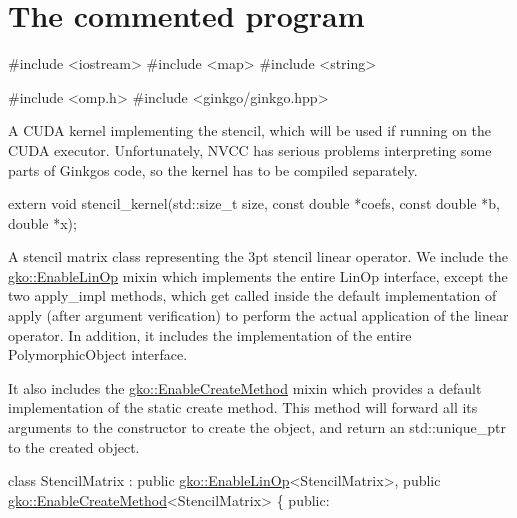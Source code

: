 \label{_CommProg}%
 \section*{The commented program}


\begin{DoxyCode}
\textcolor{preprocessor}{#include <iostream>}
\textcolor{preprocessor}{#include <map>}
\textcolor{preprocessor}{#include <string>}


\textcolor{preprocessor}{#include <omp.h>}
\textcolor{preprocessor}{#include <ginkgo/ginkgo.hpp>}
\end{DoxyCode}


A C\+U\+DA kernel implementing the stencil, which will be used if running on the C\+U\+DA executor. Unfortunately, N\+V\+CC has serious problems interpreting some parts of Ginkgo\textquotesingle{}s code, so the kernel has to be compiled separately.


\begin{DoxyCode}
\textcolor{keyword}{extern} \textcolor{keywordtype}{void} stencil\_kernel(std::size\_t size, \textcolor{keyword}{const} \textcolor{keywordtype}{double} *coefs,
                           \textcolor{keyword}{const} \textcolor{keywordtype}{double} *b, \textcolor{keywordtype}{double} *x);
\end{DoxyCode}


A stencil matrix class representing the 3pt stencil linear operator. We include the \hyperlink{classgko_1_1EnableLinOp}{gko\+::\+Enable\+Lin\+Op} mixin which implements the entire Lin\+Op interface, except the two apply\+\_\+impl methods, which get called inside the default implementation of apply (after argument verification) to perform the actual application of the linear operator. In addition, it includes the implementation of the entire Polymorphic\+Object interface.

It also includes the \hyperlink{classgko_1_1EnableCreateMethod}{gko\+::\+Enable\+Create\+Method} mixin which provides a default implementation of the static create method. This method will forward all its arguments to the constructor to create the object, and return an std\+::unique\+\_\+ptr to the created object.


\begin{DoxyCode}
\textcolor{keyword}{class }StencilMatrix : \textcolor{keyword}{public} \hyperlink{classgko_1_1EnableLinOp}{gko::EnableLinOp}<StencilMatrix>,
                      \textcolor{keyword}{public} \hyperlink{classgko_1_1EnableCreateMethod}{gko::EnableCreateMethod}<StencilMatrix> \{
\textcolor{keyword}{public}:
\end{DoxyCode}


